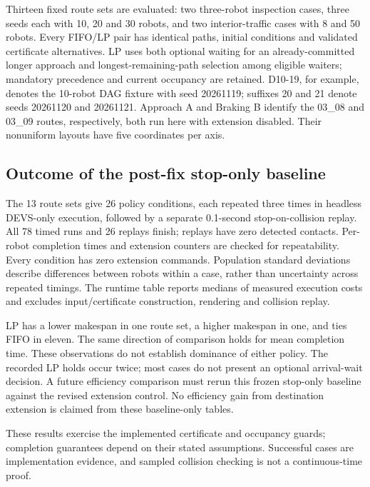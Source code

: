 \documentclass[11pt,a4paper]{article}
\theoremstyle{remark}
\begin{document}
Thirteen fixed route sets are evaluated: two three-robot inspection cases,
three seeds each with 10, 20 and 30 robots, and two interior-traffic cases with
8 and 50 robots. Every FIFO/LP pair has identical paths, initial conditions and
validated certificate alternatives. LP uses both optional waiting for an
already-committed longer approach and longest-remaining-path selection among
eligible waiters; mandatory precedence and current occupancy are retained.
D10-19, for example, denotes the 10-robot DAG fixture with seed 20261119;
suffixes 20 and 21 denote seeds 20261120 and 20261121. Approach A and Braking B
identify the 03\_08 and 03\_09 routes, respectively, both run here with
extension disabled. Their nonuniform layouts have five coordinates per axis.


\subsection{Outcome of the post-fix stop-only baseline}
The 13 route sets give 26 policy conditions, each repeated three times in
headless DEVS-only execution, followed by a separate 0.1-second
stop-on-collision replay. All 78 timed runs and 26 replays finish; replays
have zero detected contacts. Per-robot completion times and extension counters
are checked for repeatability. Every condition has zero extension commands.
Population standard deviations describe differences between robots within a
case, rather than uncertainty across repeated timings. The runtime table
reports medians of measured execution costs and excludes input/certificate
construction, rendering and collision replay.

LP has a lower makespan in one route set, a higher makespan in one, and ties
FIFO in eleven. The same direction of comparison holds for mean completion
time. These observations do not establish dominance of either policy. The
recorded LP holds occur twice; most cases do not present an optional
arrival-wait decision. A future efficiency comparison must rerun this frozen
stop-only baseline against the revised extension control. No efficiency gain
from destination extension is claimed from these baseline-only tables.

These results exercise the implemented certificate and occupancy guards;
completion guarantees depend on their stated assumptions. Successful cases
are implementation evidence, and sampled collision checking is not a
continuous-time proof.
\end{document}
